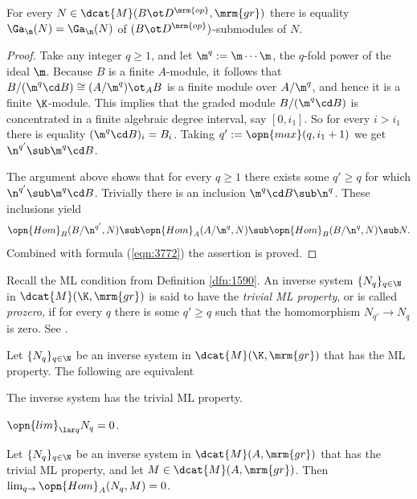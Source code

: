 \begin{lem} \label{lem:3785}
For every $N \in \dcat{M}(B \ot D^{\mrm{op}}, \mrm{gr})$
there is equality 
$\Ga_{\m}(N) = \Ga_{\n}(N)$
of $(B \ot D^{\mrm{op}})$-submodules of $N$. 
\end{lem}

\begin{proof}
Take any integer $q \geq 1$,
and let 
$\m^q := \m \cdots \m$, the $q$-fold power of the ideal $\m$. 
Because $B$ is a finite $A$-module, it follows that 
$B / (\m^q \cd B) \cong (A / \m^q) \ot_A B$
is a finite module over $A / \m^q$, and hence it is a finite $\K$-module. 
This implies that the graded module $B / (\m^q \cd B)$ is concentrated in a 
finite algebraic degree interval, say $[0, i_1]$. 
So for every $i > i_1$ there is equality $(\m^q \cd B)_i = B_i$. 
Taking $q' := \opn{max}(q, i_1 + 1)$ we get 
$\n^{q'} \sub \m^q \cd B$. 

The argument above shows that for every $q \geq 1$ there exists some 
$q' \geq q$ for which $\n^{q'} \sub \m^q \cd B$. 
Trivially there is an inclusion $\m^q \cd B \sub \n^q$.
These inclusions yield 
\[ \opn{Hom}_{B} ( B / \n^{q'} , N) \sub
\opn{Hom}_{A} ( A / \m^q , N) \sub 
\opn{Hom}_{B} ( B / \n^q , N) \sub N . \]
Combined with formula (\ref{eqn:3772}) the assertion is proved. 
\end{proof}

Recall the ML condition from Definition \ref{dfn:1590}.
An inverse system $\{ N_q \}_{q \in \N}$ 
in $\dcat{M}(\K, \mrm{gr})$ is said to have the {\em trivial ML 
property}, or is called {\em prozero}, if for every $q$ there is some 
$q' \geq q$ such that the homomorphism $N_{q'} \to N_q$ is zero. See 
\cite[Definition 3.5.6]{We}. 

\begin{lem} \label{lem:3768}
Let $\{ N_q \}_{q \in \N}$ be an inverse system in 
$\dcat{M}(\K, \mrm{gr})$ that has the ML property. The following are 
equivalent\tup{:}
\begin{enumerate}
 The inverse system has the trivial ML property.

 $\opn{lim}_{\lar q} N_q = 0$. 
\end{enumerate}
\end{lem}

\begin{lem} \label{lem:3820} 
Let $\{ N_q \}_{q \in \N}$ be an inverse system in 
$\dcat{M}(A, \mrm{gr})$ that has the trivial ML property, and let 
$M \in \dcat{M}(A, \mrm{gr})$. Then 
$\lim_{q \to} \opn{Hom}_{A}(N_q, M) = 0$.
\end{lem}

